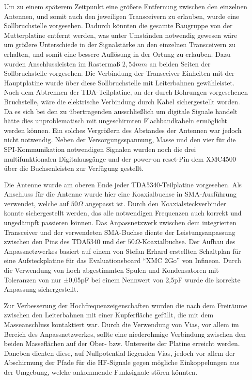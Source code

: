 Um zu einem späterem Zeitpunkt eine größere Entfernung zwischen den einzelnen Antennen, und somit auch den jeweiligen Transceivern zu erlauben, wurde eine Sollbruchstelle vorgesehen. Dadurch könnten die gesamte Baugruppe von der Mutterplatine entfernt werden, was unter Umständen notwendig gewesen wäre um größere Unterschiede in der Signalstärke an den einzelnen Transceivern zu erhalten, und somit eine bessere Auflösung in der Ortung zu erlauben. Dazu wurden Anschlussleisten im Rastermaß $2,54mm$ an beiden Seiten der Sollbruchstelle vorgesehen. Die Verbindung der Transceiver-Einheiten mit der Hauptplatine wurde über diese Sollbruchstelle mit Leiterbahnen gewähleistet. Nach dem Abtrennen der TDA-Teilplatine, an der durch Bohrungen vorgesehenen Bruchstelle, wäre die elektrische Verbindung durch Kabel sichergestellt worden. Da es sich bei den zu übertragenden ausschließlich um digitale Signale handelt hätte dies unproblematisch mit ungeschirmten Flachbandkabeln ermöglicht werden können. Ein solches Vergrößern des Abstandes der Antennen war jedoch nicht notwendig. Neben der Versorgungsspannung, Masse und den vier für die \ac{SPI}-Kommunikation notwendigen Signalen wurden noch die drei multifunktionalen Digitalausgänge und der power-on reset-Pin dem XMC4500 über die Buchsenleisten zur Verfügung gestellt.


 
Die Antenne wurde am oberen Ende jeder TDA5340-Teilplatine vorgesehen. Als Anschluss für die Antenne wurde hier eine Koaxialbuchse in \ac{SMA}-Ausführung verwendet, welche auf $50\Omega$ angepasst ist. Durch den Koaxialsteckverbinder konnte sichergestellt werden, das alle notwendigen Frequenzen auch korrekt und ungedämpft passieren können. 
Das Anpassnetzwerk zwischen dem  integrierten Transceiver und der verwendeten SMA-Buchse diente der Leistungsanpassung zwischen den Pins des TDA5340 und der $50\Omega$-Koaxialbuchse. Der Aufbau des Anpassnetzwerkes basiert auf einem von Stefan Erhard erstellten Schaltplan für eine Aufsteckplatine für das Evaluationsboard \enquote{XMC 2Go} von Infineon. Durch die Verwendung von hoch abgestimmten Spulen und Kondensatoren mit Toleranzen von nur ±0,05pF bei einem Nennwert von 2,5pF wurde die korrekte Anpassung sichergestellt. 
 
Zur Verbesserung der Hochfrequenzeigenschaften wurden die nach dem Freiräume zwischen den Leiterbahnen mit einer Kupferfläche gefüllt, die mit dem Masseanschluss kontaktiert war. Durch die Verwendung von Vias, vor allem im Bereich des Anpassnetzwerkes, sollte eine niederohmige Verbindung zwischen den beiden Masseflächen auf der Ober- bzw. Unterseite der Platine erreicht werden. Daneben dienten diese, auf Nullpotential liegenden Vias, jedoch vor allem der Abschirmung der Pfade für die HF-Signale gegen mögliche Einkoppelungen aus der Umgebung, welche ankommende Funksignale stören könnten.

